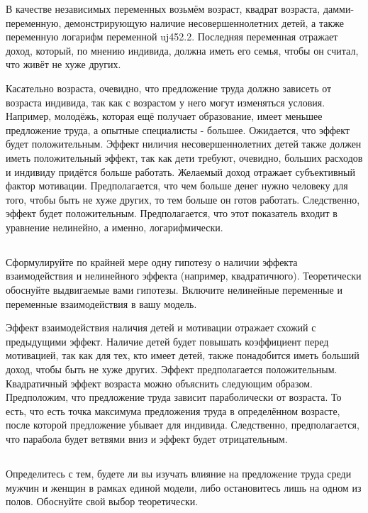 \documentclass[a4paper,12pt]{article}
\begin{document}
В качестве независимых переменных возьмём возраст, квадрат возраста, дамми-переменную, демонстрирующую наличие несовершеннолетних детей, а также переменную логарифм переменной uj452.2. Последняя переменная отражает доход, который, по мнению индивида, должна иметь его семья, чтобы он считал, что живёт не хуже других. 

Касательно возраста, очевидно, что предложение труда должно зависеть от возраста индивида, так как с возрастом у него могут изменяться условия. Например, молодёжь, которая ещё получает образование, имеет меньшее предложение труда, а опытные специалисты - большее. Ожидается, что эффект будет положительным. Эффект ниличия несовершеннолетних детей также должен иметь положительный эффект, так как дети требуют, очевидно, больших расходов и индивиду придётся больше работать. Желаемый доход отражает субъективный фактор мотивации. Предполагается, что чем больше денег нужно человеку для того, чтобы быть не хуже других, то тем больше он готов работать. Следственно, эффект будет положительным. Предполагается, что этот показатель входит в уравнение нелинейно, а именно, логарифмически.

\subsection{}

\Sun Сформулируйте по крайней мере одну гипотезу о наличии эффекта
взаимодействия и нелинейного эффекта (например, квадратичного). Теоретически
обоснуйте выдвигаемые вами гипотезы. Включите нелинейные переменные и переменные
взаимодействия в вашу модель.

 Эффект взаимодействия наличия детей и мотивации отражает схожий с предыдущими эффект. Наличие детей будет повышать коэффициент перед мотивацией, так как для тех, кто имеет детей, также понадобится иметь больший доход, чтобы быть не хуже других. Эффект предполагается положительным.  Квадратичный эффект возраста можно объяснить следующим образом. Предположим, что предложение труда зависит параболически от возраста. То есть, что есть точка максимума предложения труда в определённом возрасте, после которой предложение убывает для индивида. Следственно, предполагается, что парабола будет ветвями вниз и эффект будет отрицательным.
 
 \subsection{}
 
\Sun Определитесь с тем, будете ли вы изучать влияние на предложение труда среди
мужчин и женщин в рамках единой модели, либо остановитесь лишь на одном из полов.
Обоснуйте свой выбор теоретически.
\end{document}
